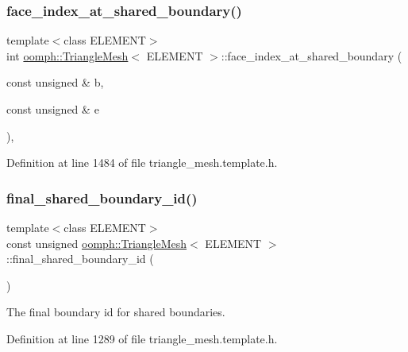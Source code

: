\subsubsection{\texorpdfstring{face\+\_\+index\+\_\+at\+\_\+shared\+\_\+boundary()}{face\_index\_at\_shared\_boundary()}}
{\footnotesize\ttfamily template$<$class E\+L\+E\+M\+E\+NT$>$ \\
int \hyperlink{classoomph_1_1TriangleMesh}{oomph\+::\+Triangle\+Mesh}$<$ E\+L\+E\+M\+E\+NT $>$\+::face\+\_\+index\+\_\+at\+\_\+shared\+\_\+boundary (\begin{DoxyParamCaption}\item[{const unsigned \&}]{b,  }\item[{const unsigned \&}]{e }\end{DoxyParamCaption})\hspace{0.3cm}{\ttfamily [inline]}, {\ttfamily [protected]}}



Definition at line 1484 of file triangle\+\_\+mesh.\+template.\+h.

\mbox{\label{classoomph_1_1TriangleMesh_aa0f608107023deae643f7bbde1882241}} 
\subsubsection{\texorpdfstring{final\+\_\+shared\+\_\+boundary\+\_\+id()}{final\_shared\_boundary\_id()}}
{\footnotesize\ttfamily template$<$class E\+L\+E\+M\+E\+NT$>$ \\
const unsigned \hyperlink{classoomph_1_1TriangleMesh}{oomph\+::\+Triangle\+Mesh}$<$ E\+L\+E\+M\+E\+NT $>$\+::final\+\_\+shared\+\_\+boundary\+\_\+id (\begin{DoxyParamCaption}{ }\end{DoxyParamCaption})\hspace{0.3cm}{\ttfamily [inline]}}



The final boundary id for shared boundaries. 



Definition at line 1289 of file triangle\+\_\+mesh.\+template.\+h.

\mbox{\label{classoomph_1_1TriangleMesh_ad1313569fdd378c04b4a0e136adf7e46}} 
